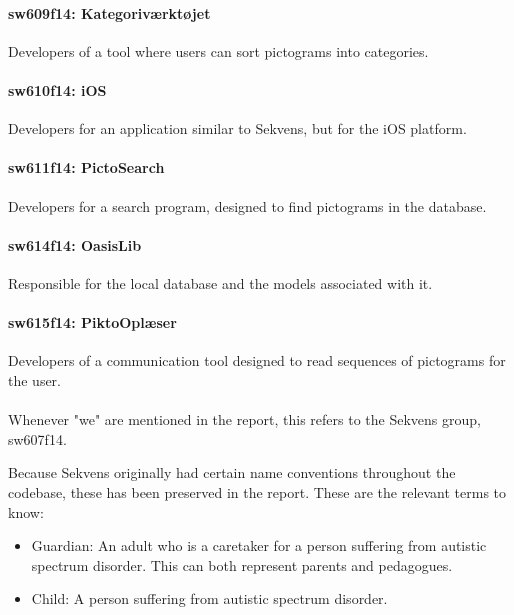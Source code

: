 \paragraph{sw609f14: Kategoriværktøjet}
Developers of a tool where users can sort pictograms into categories.
\paragraph{sw610f14: iOS}
Developers for an application similar to Sekvens, but for the iOS platform.
\paragraph{sw611f14: PictoSearch}
Developers for a search program, designed to find pictograms in the database.
\paragraph{sw614f14: OasisLib}
Responsible for the local database and the models associated with it.
\paragraph{sw615f14: PiktoOplæser}
Developers of a communication tool designed to read sequences of pictograms for the user.\\
\\

Whenever "we" are mentioned in the report, this refers to the Sekvens group, sw607f14.

Because Sekvens originally had certain name conventions throughout the codebase, these has been preserved in the report. These are the relevant terms to know:

\begin{itemize}
\item Guardian: An adult who is a caretaker for a person suffering from autistic spectrum disorder. This can both represent parents and pedagogues.
\item Child: A person suffering from autistic spectrum disorder.
\end{itemize}